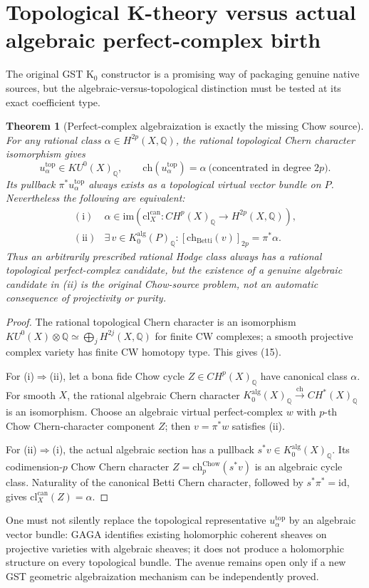 \documentclass[11pt]{article}
\newtheorem{theorem}{Theorem}
\begin{document}
\section{Topological K-theory versus actual algebraic perfect-complex birth}
The original GST K\(_0\) constructor is a promising way of packaging
genuine native sources, but the algebraic-versus-topological distinction
must be tested at its exact coefficient type.
\begin{theorem}[Perfect-complex algebraization is exactly the missing Chow source]
For any rational class \(\alpha\in H^{2p}(X,\mathbb Q)\),
the rational topological Chern character isomorphism gives
\[
 u_\alpha^{\mathrm{top}}\in KU^0(X)_{\mathbb Q},
 \qquad \mathrm{ch}(u_\alpha^{\mathrm{top}})=\alpha
 \ \text{(concentrated in degree \(2p\)).} \tag{15}
\]
Its pullback \(\pi^*u_\alpha^{\mathrm{top}}\) always exists
as a topological virtual vector bundle on \(P\).
Nevertheless the following are equivalent:
\[
 \begin{array}{ll}
 \mathrm{(i)}&
   \alpha\in \mathrm{im}(\mathrm{cl}^{\mathrm{can}}_X:
                     CH^p(X)_{\mathbb Q}\to H^{2p}(X,\mathbb Q)),\\
 \mathrm{(ii)}&
   \exists\,v\in K_0^{\mathrm{alg}}(P)_{\mathbb Q}:
     [\mathrm{ch}_{\mathrm{Betti}}(v)]_{2p}=\pi^*\alpha .
 \end{array} \tag{16}
\]
Thus an arbitrarily prescribed rational Hodge class always
has a rational \emph{topological} perfect-complex candidate,
but the existence of a genuine \emph{algebraic} candidate
in (ii) is the original Chow-source problem, not an automatic
consequence of projectivity or purity.
\end{theorem}
\begin{proof}
The rational topological Chern character is an isomorphism
\(KU^0(X)\otimes\mathbb Q\simeq
 \bigoplus_j H^{2j}(X,\mathbb Q)\)
for finite CW complexes; a smooth projective complex variety
has finite CW homotopy type. This gives (15).

For (i)\(\Rightarrow\)(ii), let a bona fide Chow cycle
\(Z\in CH^p(X)_{\mathbb Q}\) have canonical class \(\alpha\).
For smooth \(X\), the rational algebraic Chern character
\(K_0^{\mathrm{alg}}(X)_{\mathbb Q}
 \xrightarrow{\mathrm{ch}} CH^*(X)_{\mathbb Q}\)
is an isomorphism. Choose an algebraic virtual perfect-complex
\(w\) with \(p\)-th Chow Chern-character component \(Z\);
then \(v=\pi^*w\) satisfies (ii).

For (ii)\(\Rightarrow\)(i), the actual algebraic section
has a pullback \(s^*v\in K_0^{\mathrm{alg}}(X)_{\mathbb Q}\).
Its codimension-\(p\) Chow Chern character
\(Z=\mathrm{ch}^{\mathrm{Chow}}_p(s^*v)\)
is an algebraic cycle class. Naturality of the canonical Betti
Chern character, followed by \(s^*\pi^*=\mathrm{id}\),
gives \(\mathrm{cl}^{\mathrm{can}}_X(Z)=\alpha\).
\end{proof}
One must not silently replace the topological representative
\(u_\alpha^{\mathrm{top}}\) by an algebraic vector bundle:
GAGA identifies existing holomorphic coherent sheaves on
projective varieties with algebraic sheaves; it does not
produce a holomorphic structure on every topological bundle.
The avenue remains open only if a new GST geometric
algebraization mechanism can be independently proved.
\end{document}

